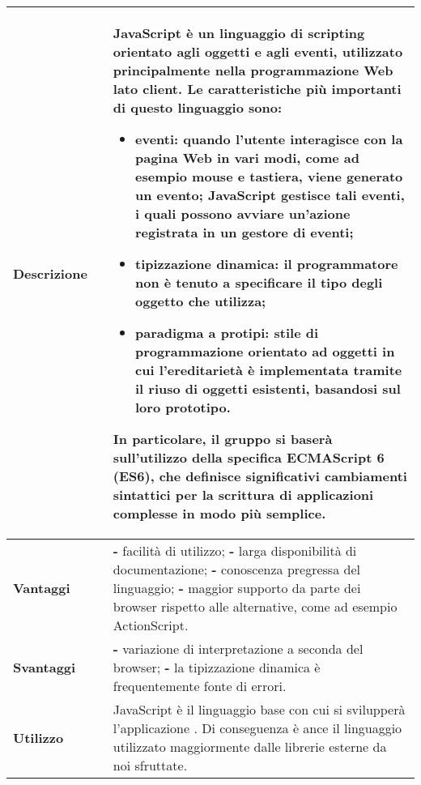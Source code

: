 \begin{table}[H]
	\centering
	\begin{tabular}{p{2cm}p{0.5cm}p{11.5cm}}
		\arrayrulecolor{lightgray}
		\toprule
		\textbf{Descrizione} & &
JavaScript è un linguaggio di scripting orientato agli oggetti e agli eventi, utilizzato principalmente nella programmazione Web lato client.
Le caratteristiche più importanti di questo linguaggio sono:
\begin{itemize}
	\item \textbf{eventi:} quando l'utente interagisce con la pagina Web in vari modi, come ad esempio mouse e tastiera, viene generato un evento; JavaScript gestisce  tali eventi, i quali possono avviare un'azione registrata in un gestore di eventi;
	\item \textbf{tipizzazione dinamica:} il programmatore non è tenuto a specificare il tipo degli oggetto che utilizza;
	\item \textbf{paradigma a protipi:} stile di programmazione orientato ad oggetti in cui l'ereditarietà è implementata tramite il riuso di oggetti esistenti, basandosi sul loro prototipo.
\end{itemize}
In particolare, il gruppo si baserà sull'utilizzo della specifica ECMAScript 6 (ES6), che definisce significativi cambiamenti sintattici per la scrittura di applicazioni complesse in modo più semplice.
		\\ \midrule
		\textbf{Vantaggi} & &
\textbf{- }facilità di utilizzo;\newline
\textbf{- }larga disponibilità di documentazione;\newline
\textbf{- }conoscenza pregressa del linguaggio;\newline
\textbf{- } maggior supporto da parte dei browser rispetto alle alternative, come ad esempio ActionScript.
		\\ \midrule
		\textbf{Svantaggi} & &
\textbf{- } variazione di interpretazione a seconda del browser;\newline
\textbf{- } la tipizzazione dinamica è frequentemente fonte di errori.
		\\ \midrule
		\textbf{Utilizzo} & &
		JavaScript è il linguaggio base con cui si svilupperà l'applicazione \progetto{}. Di conseguenza è ance il linguaggio utilizzato maggiormente dalle librerie esterne da noi sfruttate.
		\\ \bottomrule
	\end{tabular}
\end{table}


